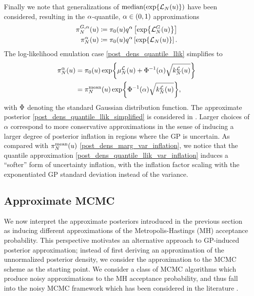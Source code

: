 \documentclass[12pt]{article}
\begin{document}
Finally we note that generalizations of $\text{median}(\Exp{\llikEm[\Ndesign](\Par)})$ have been considered, 
resulting in the $\quantileProb$-quantile, $\quantileProb \in (0,1)$ approximations 
\begin{align}
\fwdEmQDens[\Ndesign](\Par) &\Def \priorDens(\Par) \quantile \left[\Exp{\llikEmFwd[\Ndesign](\Par)} \right] \label{post_dens_quantile_fwd} \\
\llikEmQDens[\Ndesign](\Par) &\Def \priorDens(\Par) \quantile \left[\Exp{\llikEm[\Ndesign](\Par)} \right]. \label{post_dens_quantile_llik}
\end{align}
The log-likelihood emulation case \ref{post_dens_quantile_llik} simplifies to 
\begin{align}
\llikEmQDens[\Ndesign](\Par) 
&= \priorDens(\Par) \Exp{\emMean[\Ndesign]{\llik}(\Par) + \GaussianCDF^{-1}(\quantileProb) \sqrt{\emKer[\Ndesign]{\llik}(\Par)}} 
\label{post_dens_quantile_llik_simplified} \\
&= \llikEmMeanDens[\Ndesign](\Par) \Exp{\GaussianCDF^{-1}(\quantileProb) \sqrt{\emKer[\Ndesign]{\llik}(\Par)}},
\label{post_dens_quantile_llik_var_inflation}
\end{align}
with $\GaussianCDF$ denoting the standard Gaussian distribution function. The approximate posterior 
\ref{post_dens_quantile_llik_simplified} is considered in \cite{VehtariParallelGP, quantileApprox}. Larger choices 
of $\alpha$ correspond to more conservative approximations in the sense of inducing a larger degree of posterior 
inflation in regions where the GP is uncertain. As compared with $\llikEmMeanDens[\Ndesign](\Par)$
\ref{post_dens_marg_var_inflation}, we notice that the quantile approximation \ref{post_dens_quantile_llik_var_inflation}
induces a ``softer'' form of uncertainty inflation, with the inflation factor scaling with the exponentiated GP standard 
deviation instead of the variance. 

\subsection{Approximate MCMC}
We now interpret the approximate posteriors introduced in the previous section as inducing different 
approximations of the Metropolis-Hastings (MH) acceptance probability. This perspective motivates 
an alternative approach to GP-induced posterior approximation; instead of first deriving an 
approximation of the unnormalized posterior density, we consider the approximation to the MCMC 
scheme as the starting point. We consider a class of MCMC algorithms which produce 
noisy approximations to the MH acceptance probability, and thus fall into the noisy MCMC 
framework which has been considered in the literature 
\cite{noisyMCMC, stabilityNoisyMH, noisyMCSurvey, pseudoMarginalMCMC}.  
\end{document}
